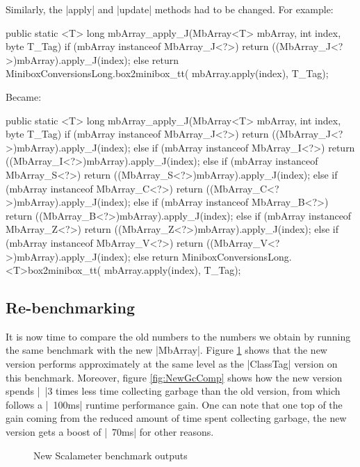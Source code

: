 Similarly, the |apply| and |update| methods had to be changed.
For example:

\begin{lstlisting-nobreak-java}
public static <T> long mbArray_apply_J(MbArray<T> mbArray, int index, byte T_Tag) {
  if (mbArray instanceof MbArray_J<?>)
    return ((MbArray_J<?>)mbArray).apply_J(index);
  else
    return MiniboxConversionsLong.box2minibox_tt(
    	mbArray.apply(index), T_Tag);
}
\end{lstlisting-nobreak-java}

Became:

\begin{lstlisting-nobreak-java}
public static <T> long mbArray_apply_J(MbArray<T> mbArray, int index, byte T_Tag) {
  if (mbArray instanceof MbArray_J<?>)
    return ((MbArray_J<?>)mbArray).apply_J(index);
  else if (mbArray instanceof MbArray_I<?>)
    return ((MbArray_I<?>)mbArray).apply_J(index);
  else if (mbArray instanceof MbArray_S<?>)
    return ((MbArray_S<?>)mbArray).apply_J(index);
  else if (mbArray instanceof MbArray_C<?>)
    return ((MbArray_C<?>)mbArray).apply_J(index);
  else if (mbArray instanceof MbArray_B<?>)
    return ((MbArray_B<?>)mbArray).apply_J(index);
  else if (mbArray instanceof MbArray_Z<?>)
    return ((MbArray_Z<?>)mbArray).apply_J(index);
  else if (mbArray instanceof MbArray_V<?>)
    return ((MbArray_V<?>)mbArray).apply_J(index);
  else
    return MiniboxConversionsLong.<T>box2minibox_tt(
    	mbArray.apply(index), T_Tag);
}
\end{lstlisting-nobreak-java}

\subsection{Re-benchmarking}

It is now time to compare the old numbers to the numbers we obtain by running the same benchmark with the new |MbArray|. Figure \ref{fig:NewCTvsMB} shows that the new version performs approximately at the same level as the |ClassTag| version on this benchmark. Moreover, figure \ref{fig:NewGcComp} shows how the new version spends |~|3 times less time collecting garbage than the old version, from which follows a |~100ms| runtime performance gain. One can note that one top of the gain coming from the reduced amount of time spent collecting garbage, the new version gets a boost of |~70ms| for other reasons. 

\begin{figure}
\caption{New Scalameter benchmark outputs}
\label{fig:NewCTvsMB}
\end{figure}  

